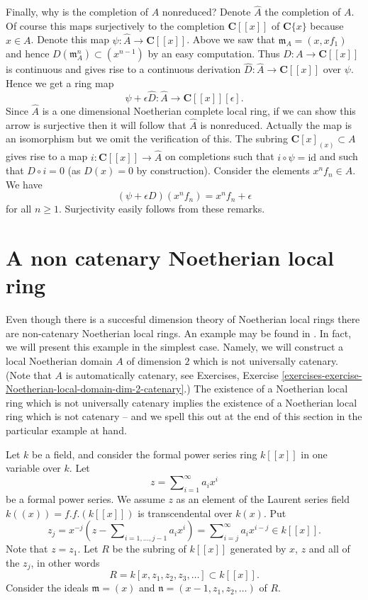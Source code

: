\medskip\noindent
Finally, why is the completion of $A$ nonreduced? Denote $\hat A$ the
completion of $A$. Of course this maps surjectively to the completion
$\mathbf{C}[[x]]$ of $\mathbf{C}\{x\}$ because $x \in A$. Denote
this map $\psi : \hat A \to \mathbf{C}[[x]]$.
Above we saw that $\mathfrak m_A = (x, xf_1)$
and hence $D(\mathfrak m_A^n) \subset (x^{n - 1})$ by an easy
computation. Thus $D : A \to \mathbf{C}[[x]]$ is continuous and
gives rise to a continuous derivation $\hat D : \hat A \to \mathbf{C}[[x]]$
over $\psi$. Hence we get a ring map
$$
\psi + \epsilon \hat D :
\hat A
\longrightarrow
\mathbf{C}[[x]][\epsilon].
$$
Since $\hat A$ is a one dimensional Noetherian complete local ring, if we
can show this arrow is surjective then it will follow that $\hat A$
is nonreduced. Actually the map is an isomorphism but we omit the
verification of this. The subring $\mathbf{C}[x]_{(x)} \subset A$
gives rise to a map $i : \mathbf{C}[[x]] \to \hat A$ on completions such
that $i \circ \psi = \text{id}$ and such that $D \circ i = 0$
(as $D(x) = 0$ by construction). Consider the elements $x^nf_n \in A$.
We have
$$
(\psi + \epsilon D)(x^nf_n) = x^n f_n + \epsilon
$$
for all $n \geq 1$. Surjectivity easily follows from these remarks.




\section{A non catenary Noetherian local ring}
\label{section-non-catenary-Noetherian-local}

\noindent
Even though there is a succesful dimension theory of Noetherian local rings
there are non-catenary Noetherian local rings. An example may be found in
\cite[Appendix, Example 2]{Nagata}. In fact, we will present this example
in the simplest case. Namely, we will construct a local Noetherian domain $A$
of dimension $2$ which is not universally catenary. (Note that $A$ is
automatically catenary, see
Exercises, Exercise
\ref{exercises-exercise-Noetherian-local-domain-dim-2-catenary}.)
The existence of a Noetherian local ring which is not universally
catenary implies the existence of a Noetherian local ring which
is not catenary -- and we spell this out at the end of this section
in the particular example at hand.

\medskip\noindent
Let $k$ be a field, and consider the formal power series ring
$k[[x]]$ in one variable over $k$. Let
$$
z = \sum\nolimits_{i = 1}^\infty a_i x^i
$$
be a formal power series. We assume $z$ as an element of the Laurent
series field $k((x)) = f.f.(k[[x]])$ is transcendental over $k(x)$.
Put
$$
z_j
=
x^{-j}(z - \sum\nolimits_{i = 1, \ldots, j - 1} a_i x^i)
=
\sum\nolimits_{i = j}^\infty a_i x^{i - j}
\in k[[x]].
$$
Note that $z = z_1$.
Let $R$ be the subring of $k[[x]]$ generated by $x$, $z$ and all of the
$z_j$, in other words
$$
R = k[x, z_1, z_2, z_3, \ldots ] \subset k[[x]].
$$
Consider the ideals $\mathfrak m = (x)$ and
$\mathfrak n = (x - 1, z_1, z_2, \ldots)$ of $R$.

